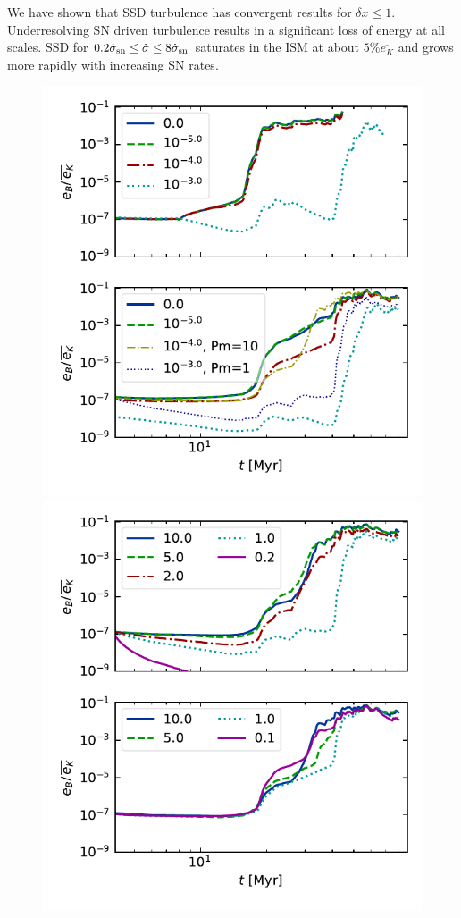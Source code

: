 \documentclass[preprint2]{aastex63}
\newcommand\SNr{\dot\sigma_{\rm sn}}
\newcommand\dx{ {\delta x}}
\newcommand{\fg}[1]{\textcolor{midgreen}{#1}}
\begin{document}
 \fg{We have shown that SSD turbulence has convergent results for $\dx\leq1$.
 Underresolving SN driven turbulence results in a significant loss of energy
 at all scales.
 SSD for $0.2\SNr\leq \dot\sigma \leq 8\SNr$ saturates in the ISM at about
 $5\%\overline{e_K}$ and grows more rapidly with increasing SN rates.
 } 


\begin{figure}
  \includegraphics[trim=0.5cm 0.0cm 0.3cm 0.0cm, clip=true,width=\columnwidth]{figs/1pc-eB-nu4.pdf}
  \includegraphics[trim=0.5cm 0.0cm 0.3cm 0.0cm, clip=true,width=\columnwidth]{figs/1pc-eB-nu5.pdf}\\

\end{figure}
\end{document}
